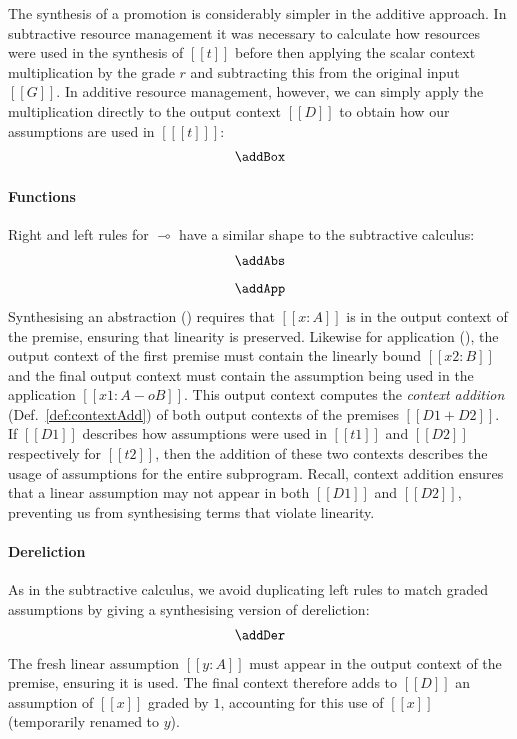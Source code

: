 The synthesis of a promotion is considerably simpler in the additive
approach. In subtractive resource management it was necessary to calculate how
resources were used in the synthesis of $[[t]]$ before then applying the
scalar context multiplication by the grade $r$ and subtracting this from the
original input $[[G]]$. In additive resource management, however, we can simply
apply the multiplication directly to the output context $[[D]]$ to obtain how
our assumptions are used in $[[ [t] ]]$:
%
\begin{align*}
  \addBox
\end{align*}

\paragraph{Functions}
Right and left rules for $\multimap$ have a similar shape to the
subtractive calculus:
%
\begin{align*}
\begin{array}{c}
\addAbs
\\[0.8em]
\addApp
\end{array}
\end{align*}
%
Synthesising an abstraction (\addAbsName) requires that $[[x : A]]$ is in
the output context of the premise, ensuring that linearity is preserved.
Likewise for application (\addAppName), the output
context of the first premise must contain the linearly bound $[[x2 :
B]]$ and the final output context must contain the assumption being used in the
application $[[ x1 : A -o B ]]$. This output context computes the \emph{context
addition} (Def.~\ref{def:contextAdd}) of both output contexts of the premises $[[D1 + D2]]$. If $[[D1]]$
describes how assumptions were used in $[[t1]]$ and $[[D2]]$ respectively for
$[[t2]]$, then the addition of these two contexts describes the usage of
assumptions for the entire subprogram. Recall, context addition
ensures that a linear assumption may not appear in both $[[D1]]$ and
$[[D2]]$, preventing us from synthesising terms that violate linearity.



\paragraph{Dereliction}
As in the subtractive calculus,
we avoid duplicating left rules to
match graded assumptions by giving a synthesising version of dereliction:
\begin{align*}
  \addDer
  \end{align*}
%
The fresh linear assumption $[[ y : A ]]$ must
appear in the output context of the premise, ensuring it is used. The final
context therefore adds to $[[ D ]]$ an assumption of $[[x]]$ graded by
$1$, accounting for this use of $[[ x ]]$ (temporarily renamed to
$y$).

